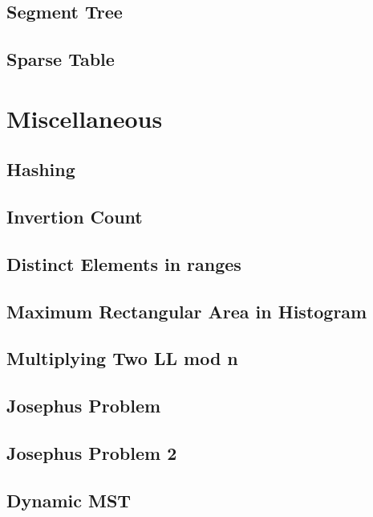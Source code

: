 \subsection{Segment Tree}
\raggedbottom
\hrulefill
\subsection{Sparse Table}
\raggedbottom
\hrulefill

\section{Miscellaneous}
\subsection{Hashing}
\raggedbottom
\hrulefill
\subsection{Invertion Count}
\raggedbottom
\hrulefill
\subsection{Distinct Elements in ranges}
\raggedbottom
\hrulefill
\subsection{Maximum Rectangular Area in Histogram}
\raggedbottom
\hrulefill
\subsection{Multiplying Two LL mod n}
\raggedbottom
\hrulefill
\subsection{Josephus Problem}
\raggedbottom
\hrulefill
\subsection{Josephus Problem 2}
\raggedbottom
\hrulefill
\subsection{Dynamic MST}
\raggedbottom
\hrulefill

